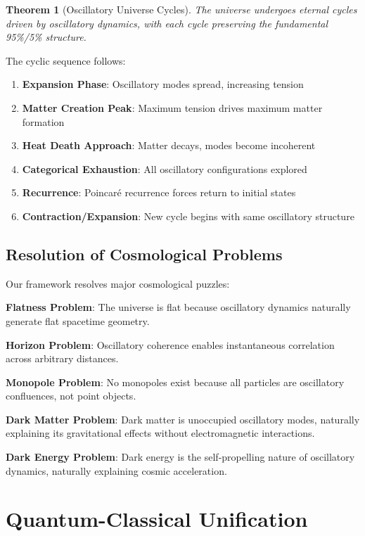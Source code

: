 \documentclass[11pt]{article}
\newtheorem{theorem}{Theorem}[section]
\theoremstyle{remark}
\begin{document}
\begin{theorem}[Oscillatory Universe Cycles]
The universe undergoes eternal cycles driven by oscillatory dynamics, with each cycle preserving the fundamental 95\%/5\% structure.
\end{theorem}

The cyclic sequence follows:
\begin{enumerate}
\item \textbf{Expansion Phase}: Oscillatory modes spread, increasing tension
\item \textbf{Matter Creation Peak}: Maximum tension drives maximum matter formation
\item \textbf{Heat Death Approach}: Matter decays, modes become incoherent
\item \textbf{Categorical Exhaustion}: All oscillatory configurations explored
\item \textbf{Recurrence}: Poincaré recurrence forces return to initial states
\item \textbf{Contraction/Expansion}: New cycle begins with same oscillatory structure
\end{enumerate}

\subsection{Resolution of Cosmological Problems}

Our framework resolves major cosmological puzzles:

\textbf{Flatness Problem}: The universe is flat because oscillatory dynamics naturally generate flat spacetime geometry.

\textbf{Horizon Problem}: Oscillatory coherence enables instantaneous correlation across arbitrary distances.

\textbf{Monopole Problem}: No monopoles exist because all particles are oscillatory confluences, not point objects.

\textbf{Dark Matter Problem}: Dark matter is unoccupied oscillatory modes, naturally explaining its gravitational effects without electromagnetic interactions.

\textbf{Dark Energy Problem}: Dark energy is the self-propelling nature of oscillatory dynamics, naturally explaining cosmic acceleration.

\section{Quantum-Classical Unification}
\end{document}
